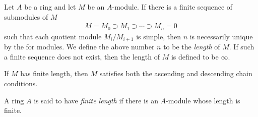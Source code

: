 \documentclass[12pt]{article}
\newcommand{\<}{\langle}
\renewcommand{\>}{\rangle}
\begin{document}
Let $A$ be a ring and let $M$ be an $A$-module.  If there is a finite sequence of submodules of $M$
\begin{align*}
M=M_0\supset M_1\supset \cdots \supset M_n=0
\end{align*}
such that each quotient module $M_i/M_{i+1}$ is simple, then $n$ is necessarily unique by the  for modules.  We define the above number $n$ to be the \emph{length} of $M$.  If such a finite sequence does not exist, then the length of $M$ is defined to be $\infty$.

If $M$ has finite length, then $M$ satisfies both the ascending and descending chain conditions.

A ring $A$ is said to have \emph{finite length} if there is an $A$-module whose length is finite.
\end{document}
